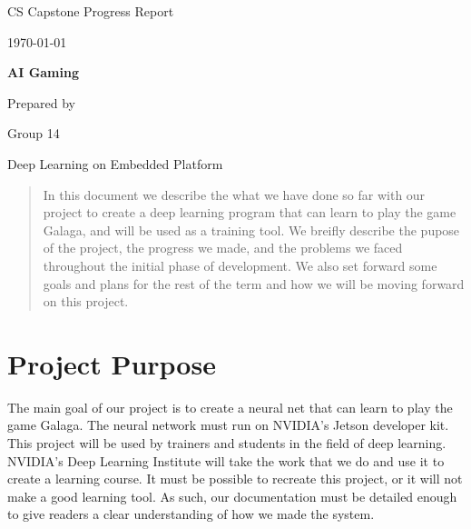 \documentclass[onecolumn, draftclsnofoot,10pt, compsoc]{IEEEtran}
\def \CapstoneTeamName{		Deep Learning on Embedded Platform}
\def \CapstoneTeamNumber{		14}
\def \CapstoneProjectName{		AI Gaming}
\def \DocType{	%
				Progress Report
				}
\begin{document}
\begin{titlepage}
    \begin{singlespace}
        \hfill
        \par\vspace{.2in}
        \centering
        \scshape{
            \huge CS Capstone \DocType \par
            {\large\today}\par
            \vspace{.5in}
            \textbf{\Huge\CapstoneProjectName}\par
            {\large Prepared by }\par
            Group\CapstoneTeamNumber\par
            \CapstoneTeamName\par
            \vspace{5pt}
        }
        \begin{abstract}
        In this document we describe the what we have done so far with our project to create a deep learning program that can learn to play the game Galaga, and will be used as a training tool.
	We breifly describe the pupose of the project, the progress we made, and the problems we faced throughout the initial phase of development.
	We also set forward some goals and plans for the rest of the term and how we will be moving forward on this project.

        \end{abstract}
    \end{singlespace}
\end{titlepage}

\newpage
{}
\tableofcontents

\section{Project Purpose}
The main goal of our project is to create a neural net that can learn to play the game Galaga.
The neural network must run on NVIDIA's Jetson developer kit.
This project will be used by trainers and students in the field of deep learning.
NVIDIA's Deep Learning Institute will take the work that we do and use it to create a learning course.
It must be possible to recreate this project, or it will not make a good learning tool.
As such, our documentation must be detailed enough to give readers a clear understanding of how we made the system.
\end{document}
